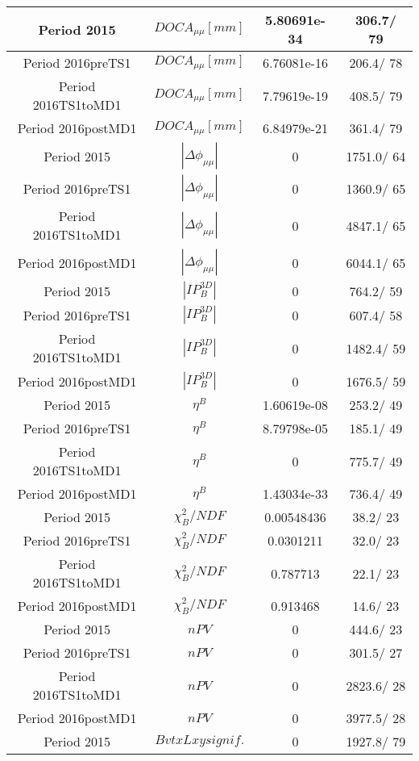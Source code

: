 \documentclass{article}
\begin{document}
\begin{longtable}{c|c|c|c}
\hline
 Period 2015 & $DOCA_{\mu\mu} [mm]$ & 5.80691e-34 & 306.7/ 79\\
\hline
 Period 2016preTS1 & $DOCA_{\mu\mu} [mm]$ & 6.76081e-16 & 206.4/ 78\\
\hline
 Period 2016TS1toMD1 & $DOCA_{\mu\mu} [mm]$ & 7.79619e-19 & 408.5/ 79\\
\hline
 Period 2016postMD1 & $DOCA_{\mu\mu} [mm]$ & 6.84979e-21 & 361.4/ 79\\
\hline
 Period 2015 & $|\Delta\phi_{\mu\mu}|$ & 0 & 1751.0/ 64\\
\hline
 Period 2016preTS1 & $|\Delta\phi_{\mu\mu}|$ & 0 & 1360.9/ 65\\
\hline
 Period 2016TS1toMD1 & $|\Delta\phi_{\mu\mu}|$ & 0 & 4847.1/ 65\\
\hline
 Period 2016postMD1 & $|\Delta\phi_{\mu\mu}|$ & 0 & 6044.1/ 65\\
\hline
 Period 2015 & $|IP_{B}^{3D}|$ & 0 & 764.2/ 59\\
\hline
 Period 2016preTS1 & $|IP_{B}^{3D}|$ & 0 & 607.4/ 58\\
\hline
 Period 2016TS1toMD1 & $|IP_{B}^{3D}|$ & 0 & 1482.4/ 59\\
\hline
 Period 2016postMD1 & $|IP_{B}^{3D}|$ & 0 & 1676.5/ 59\\
\hline
 Period 2015 & $\eta^{B}$ & 1.60619e-08 & 253.2/ 49\\
\hline
 Period 2016preTS1 & $\eta^{B}$ & 8.79798e-05 & 185.1/ 49\\
\hline
 Period 2016TS1toMD1 & $\eta^{B}$ & 0 & 775.7/ 49\\
\hline
 Period 2016postMD1 & $\eta^{B}$ & 1.43034e-33 & 736.4/ 49\\
\hline
 Period 2015 & $\chi^{2}_{B}/NDF$ & 0.00548436 &  38.2/ 23\\
\hline
 Period 2016preTS1 & $\chi^{2}_{B}/NDF$ & 0.0301211 &  32.0/ 23\\
\hline
 Period 2016TS1toMD1 & $\chi^{2}_{B}/NDF$ & 0.787713 &  22.1/ 23\\
\hline
 Period 2016postMD1 & $\chi^{2}_{B}/NDF$ & 0.913468 &  14.6/ 23\\
\hline
 Period 2015 & $nPV$ & 0 & 444.6/ 23\\
\hline
 Period 2016preTS1 & $nPV$ & 0 & 301.5/ 27\\
\hline
 Period 2016TS1toMD1 & $nPV$ & 0 & 2823.6/ 28\\
\hline
 Period 2016postMD1 & $nPV$ & 0 & 3977.5/ 28\\
\hline
 Period 2015 & $BvtxLxy signif.$ & 0 & 1927.8/ 79\\

\end{longtable}
\end{document}
